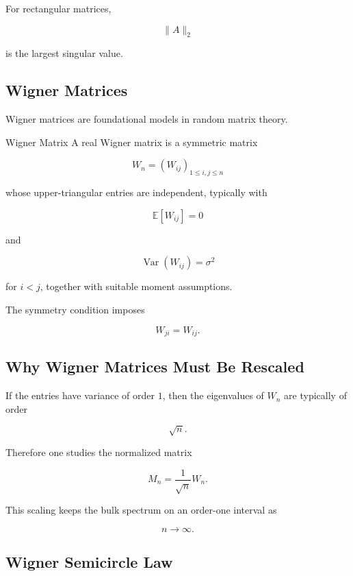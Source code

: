 For rectangular matrices,

\[
\|A\|_2
\]

is the largest singular value.

\subsection{Wigner Matrices}
\label{subsec:wigner-matrices}

Wigner matrices are foundational models in random matrix theory.

\begin{definitionbox}{Wigner Matrix}
A real Wigner matrix is a symmetric matrix

\[
W_n=(W_{ij})_{1\leq i,j\leq n}
\]

whose upper-triangular entries are independent, typically with

\[
\mathbb{E}[W_{ij}]=0
\]

and

\[
\operatorname{Var}(W_{ij})=\sigma^2
\]

for \(i<j\), together with suitable moment assumptions.
\end{definitionbox}

The symmetry condition imposes

\[
W_{ji}=W_{ij}.
\]

\subsection{Why Wigner Matrices Must Be Rescaled}
\label{subsec:wigner-scaling}

If the entries have variance of order \(1\), then the eigenvalues of
\(W_n\) are typically of order

\[
\sqrt{n}.
\]

Therefore one studies the normalized matrix

\[
\boxed{
M_n
=
\frac{1}{\sqrt{n}}W_n.
}
\]

This scaling keeps the bulk spectrum on an order-one interval as

\[
n\to\infty.
\]

\subsection{Wigner Semicircle Law}
\label{subsec:wigner-semicircle-law}

